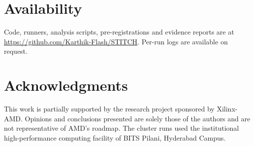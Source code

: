\documentclass[11pt]{article}
\begin{document}
\section*{Availability}
Code, runners, analysis scripts, pre-registrations and evidence reports are at
\url{https://github.com/Karthik-Flash/STITCH}. Per-run logs are available on
request.

\section*{Acknowledgments}
This work is partially supported by the research project sponsored by
Xilinx-AMD. Opinions and conclusions presented are solely those of the authors
and are not representative of AMD's roadmap. The cluster runs used the
institutional high-performance computing facility of BITS Pilani, Hyderabad
Campus.
\end{document}
